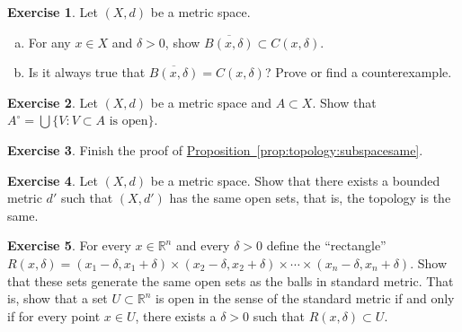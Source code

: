 \documentclass[12pt,openany]{book}
\newcommand{\R}{{\mathbb{R}}}
\theoremstyle{plain}
\theoremstyle{remark}
\theoremstyle{definition}
\newenvironment{exbox}{%
    \def\FrameCommand{\vrule width 1pt \relax\hspace {10pt}}%
    \MakeFramed {\advance \hsize -\width \FrameRestore }%
}{%
    \endMakeFramed
}
\newenvironment{exparts}{%
    \leavevmode\begin{enumerate}[a),noitemsep,topsep=0pt,parsep=0pt,partopsep=0pt]
}{%
    \end{enumerate}
}
\theoremstyle{exercise}
\newtheorem{exercise}{Exercise}[section]
\theoremstyle{example}
\newcommand{\propref}[1]{\hyperref[#1]{Proposition~\ref*{#1}}}
\begin{document}
\begin{exbox}
\begin{samepage}
\begin{exercise}
Let $(X,d)$ be a metric space.
\begin{exparts}
\item
For any $x \in X$ and $\delta > 0$, show
$\overline{B(x,\delta)} \subset C(x,\delta)$.
\item
Is it always true that
$\overline{B(x,\delta)} = C(x,\delta)$?  Prove or find a counterexample.
\end{exparts}
\end{exercise}
\end{samepage}

\begin{exercise}
Let $(X,d)$ be a metric space and $A \subset X$.  Show that
$A^\circ = \bigcup \{ V : V \subset A \text{ is open} \}$.
\end{exercise}

\begin{exercise}
Finish the proof of \propref{prop:topology:subspacesame}.
\end{exercise}

\begin{exercise}
Let $(X,d)$ be a metric space.  Show that there exists a bounded metric
$d'$ such that $(X,d')$ has the same open sets, that is, the topology is
the same.
\end{exercise}


\begin{exercise}
For every $x \in \R^n$ and every $\delta > 0$ define the ``rectangle''
$R(x,\delta) =
(x_1-\delta,x_1+\delta) \times
(x_2-\delta,x_2+\delta) \times \cdots \times
(x_n-\delta,x_n+\delta)$.  Show that these sets generate the same open
sets as the balls in standard metric.  That is, show that a set $U \subset \R^n$
is open in the sense of the standard metric if and only if for every
point $x \in U$, there exists a $\delta > 0$ such that $R(x,\delta) \subset
U$.
\end{exercise}
\end{exbox}
\end{document}
